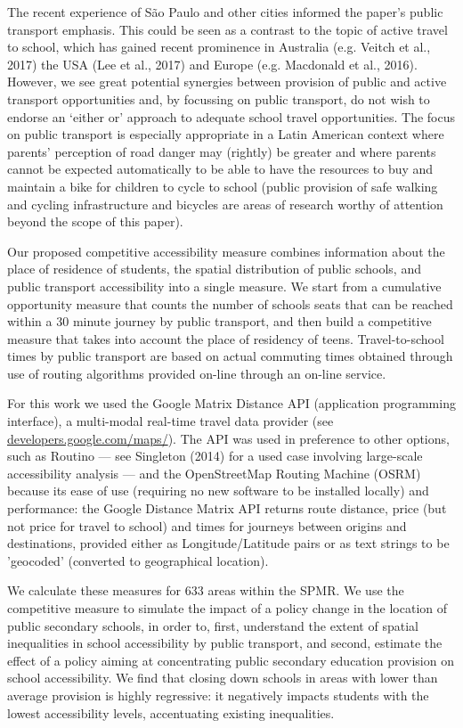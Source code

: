 \documentclass[3p,authoryear,preprint,review,12pt]{elsarticle}
\begin{document}
The recent experience of São Paulo and other cities informed the paper's public transport emphasis. 
This could be seen as a contrast to the topic of active travel to school, which has gained recent prominence in Australia (e.g. Veitch et al., 2017) the USA (Lee et al., 2017) and Europe (e.g. Macdonald et al., 2016).
However, we see great potential synergies between provision of public and active transport opportunities and, by focussing on public transport, do not wish to endorse an `either or' approach to adequate school travel opportunities.
The focus on public transport is especially appropriate in a Latin American context where parents' perception of road danger may (rightly) be greater and where parents cannot be expected automatically to be able to have the resources to buy and maintain a bike for children to cycle to school (public provision of safe walking and cycling infrastructure and bicycles are areas of research worthy of attention beyond the scope of this paper).

Our proposed competitive accessibility measure combines information
about the place of residence of students, the spatial distribution of public schools, and public transport accessibility into a single
measure. We start from a cumulative opportunity measure that counts the number of schools seats that can be reached within a 30 minute journey by public transport, and then build a competitive measure that takes into account the place of residency of teens. Travel-to-school times by public transport are based on actual commuting times obtained through use of routing algorithms provided on-line through an on-line service. 

For this work we used the Google Matrix Distance API
(application programming interface), a multi-modal
real-time travel data provider (see \href{https://developers.google.com/maps/documentation/distance-matrix/}{developers.google.com/maps/}). 
The API was used in preference to other options,
such as Routino --- see Singleton (2014) for a used case involving large-scale accessibility analysis ---
and the OpenStreetMap Routing Machine (OSRM)
because its
ease of use (requiring no new software to be installed locally)
and performance: the Google Distance Matrix
API returns
route distance, price (but not price for travel to school) and times for journeys between origins and
destinations, provided either as Longitude/Latitude pairs or
as text strings to be 'geocoded' (converted to geographical location).

We calculate these measures for 633 areas within the SPMR. We use the competitive measure to simulate the impact of a policy change in the location of public secondary schools, in order to, first, understand the extent of spatial inequalities in school accessibility by public transport, and second, estimate the
effect of a policy aiming at concentrating public secondary education provision on school accessibility. We find that closing down schools in areas with lower than average provision is highly regressive: it
negatively impacts students with the lowest accessibility levels,
accentuating existing inequalities.
\end{document}

